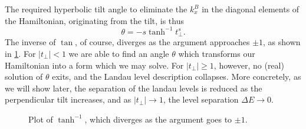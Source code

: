 The required hyperbolic tilt angle to eliminate the \(k^B_{x}\) in the diagonal elements of the Hamiltonian, originating from the tilt, is thus
\begin{equation}
  \label{eq:38}
  \theta = - s \tanh^{-1} t^s_{\perp}.
\end{equation}
The inverse of \(\tan \), of course, diverges as the argument approaches \(\pm 1\), as shown in \cref{fig:arctanh}.
For \(|t_{\perp}| < 1\) we are able to find an angle \(\theta \) which transforms our Hamiltonian into a form which we may solve.
For \(|t_{\perp}| \geq 1\), however, no (real) solution of \(\theta \) exits, and the Landau level description collapses.
More concretely, as we will show later, the separation of the landau levels is reduced as the perpendicular tilt increases, and as \( |t_\perp| \to 1 \), the level separation \( \Delta E \to 0 \).

\begin{figure}[htb]
  \centering
  \caption{\label{fig:arctanh} Plot of \(\tanh^{-1}\), which diverges as the argument goes to \(\pm 1\).}
\end{figure}


